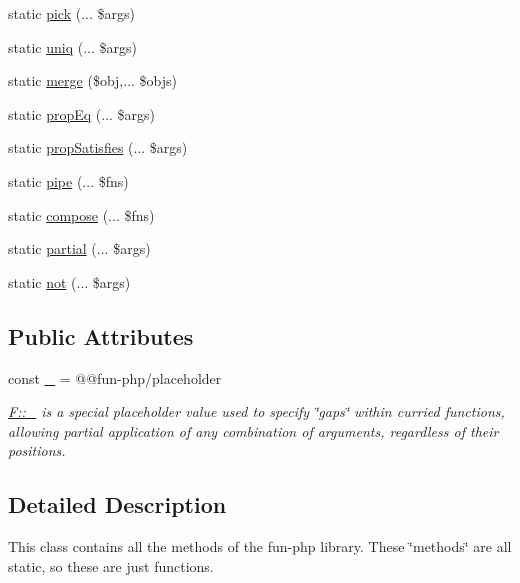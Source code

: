 \begin{DoxyCompactItemize}
static \hyperlink{classboehm__s_1_1F_a1ed294c2887f1f3bb520236a993259fd}{pick} (... \$args)
\item 
static \hyperlink{classboehm__s_1_1F_a9015b4c01377f2a42e1ec9069f79d9e4}{uniq} (... \$args)
\item 
static \hyperlink{classboehm__s_1_1F_ac833c309186225e5587fd45dfef22aca}{merge} (\$obj,... \$objs)
\item 
static \hyperlink{classboehm__s_1_1F_ada046f8c33b77f3d3ca40e12bc42c5db}{prop\+Eq} (... \$args)
\item 
static \hyperlink{classboehm__s_1_1F_a6d71ddfdd2b6c90fe356808bd332bb3f}{prop\+Satisfies} (... \$args)
\item 
static \hyperlink{classboehm__s_1_1F_a353205345113144a6fd6f874097377bc}{pipe} (... \$fns)
\item 
static \hyperlink{classboehm__s_1_1F_a1712c41e5be41e6f6e2088ed5d54a864}{compose} (... \$fns)
\item 
static \hyperlink{classboehm__s_1_1F_ab29a37d2aca75028895148da5da15b4b}{partial} (... \$args)
\item 
static \hyperlink{classboehm__s_1_1F_a0cf3df6448dbfa748f755494974d13ab}{not} (... \$args)
\end{DoxyCompactItemize}
\subsection*{Public Attributes}
\begin{DoxyCompactItemize}
\item 
const \hyperlink{classboehm__s_1_1F_ab837ec3c9abe3d1a244817fd4c18eda7}{\+\_\+} = \textquotesingle{}@@fun-\/php/placeholder\textquotesingle{}
\begin{DoxyCompactList}\small\item\em {\ttfamily \hyperlink{classboehm__s_1_1F_ab837ec3c9abe3d1a244817fd4c18eda7}{F\+::\+\_\+}} is a special placeholder value used to specify \char`\"{}gaps\char`\"{} within curried functions, allowing partial application of any combination of arguments, regardless of their positions. \end{DoxyCompactList}\end{DoxyCompactItemize}


\subsection{Detailed Description}
This class contains all the methods of the fun-\/php library. These \char`\"{}methods\char`\"{} are all static, so these are just functions. 

